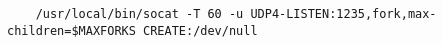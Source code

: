 
\begin{lstlisting}
    /usr/local/bin/socat -T 60 -u UDP4-LISTEN:1235,fork,max-children=$MAXFORKS CREATE:/dev/null
\end{lstlisting}

